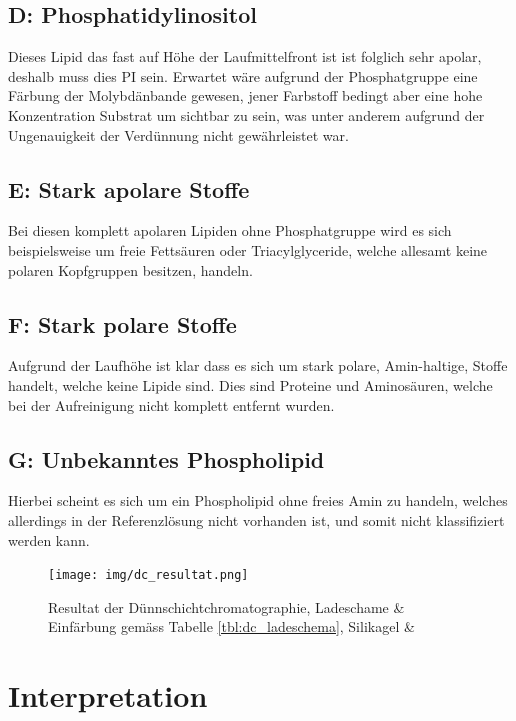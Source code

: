 \documentclass[a4paper,english]{scrreprt}
\begin{document}
\subsection{D: Phosphatidylinositol}

Dieses Lipid das fast auf Höhe der Laufmittelfront ist ist folglich sehr
apolar, deshalb muss dies PI sein. Erwartet wäre aufgrund der Phosphatgruppe
eine Färbung der Molybdänbande gewesen, jener Farbstoff bedingt aber eine hohe
Konzentration Substrat um sichtbar zu sein, was unter anderem aufgrund der
Ungenauigkeit der Verdünnung nicht gewährleistet war.

\subsection{E: Stark apolare Stoffe}

Bei diesen komplett apolaren Lipiden ohne Phosphatgruppe wird es sich
beispielsweise um freie Fettsäuren oder Triacylglyceride, welche allesamt keine
polaren Kopfgruppen besitzen, handeln.

\subsection{F: Stark polare Stoffe}

Aufgrund der Laufhöhe ist klar dass es sich um stark polare, Amin-haltige,
Stoffe handelt, welche keine Lipide sind. Dies sind Proteine und Aminosäuren,
welche bei der Aufreinigung nicht komplett entfernt wurden.

\subsection{G: Unbekanntes Phospholipid}

Hierbei scheint es sich um ein Phospholipid ohne freies Amin zu handeln,
welches allerdings in der Referenzlösung nicht vorhanden ist, und somit nicht
klassifiziert werden kann.

\begin{figure}
	\centering
	\texttt{[image: img/dc\_resultat.png]}
	\caption{Resultat der Dünnschichtchromatographie, Ladeschame \& Einfärbung gemäss Tabelle \ref{tbl:dc_ladeschema}, Silikagel \& }
	\label{fig:dc_resultat}
\end{figure}

\section{Interpretation}
\end{document}
